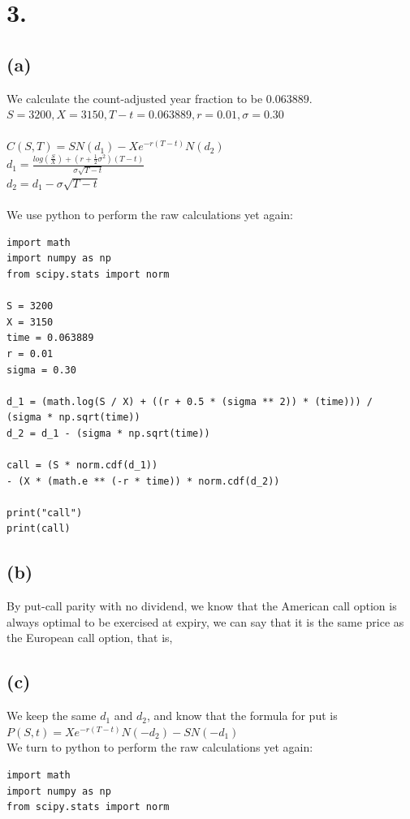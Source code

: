 \documentclass{article}
\begin{document}
\section*{3.}
{\Large 

\subsection*{(a)}

We calculate the count-adjusted year fraction to be $0.063889$. \\
$S = 3200, X = 3150, T-t = 0.063889, r = 0.01, \sigma = 0.30$ \\ \\
$C(S, T) = SN(d_1) - Xe^{-r(T-t)}N(d_2)$ \\
$d_1 = \frac{log(\frac{S}{X}) + (r+\frac{1}{2}\sigma^2)(T-t)}{\sigma\sqrt{T-t}}$ \\
$d_2 = d_1 - \sigma\sqrt{T-t}$ \\ \\
We use python to perform the raw calculations yet again:
\begin{verbatim}
import math
import numpy as np
from scipy.stats import norm

S = 3200
X = 3150
time = 0.063889
r = 0.01
sigma = 0.30

d_1 = (math.log(S / X) + ((r + 0.5 * (sigma ** 2)) * (time))) / 
(sigma * np.sqrt(time))
d_2 = d_1 - (sigma * np.sqrt(time))

call = (S * norm.cdf(d_1)) 
- (X * (math.e ** (-r * time)) * norm.cdf(d_2))

print("call")
print(call)
\end{verbatim}

\subsection*{(b)}

By put-call parity with no dividend, we know that the American call option is always optimal to be exercised at expiry, we can say that it is the same price as the European call option, that is, 

\subsection*{(c)}

We keep the same $d_1$ and $d_2$, and know that the formula for put is $P(S, t) = Xe^{-r(T - t)}N(-d_2) - SN(-d_1)$ \\
We turn to python to perform the raw calculations yet again:
\begin{verbatim}
import math
import numpy as np
from scipy.stats import norm


\end{verbatim}}
\end{document}
